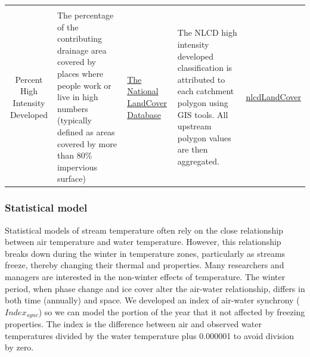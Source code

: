 \documentclass[]{article}
\begin{document}
\begin{longtable}[c]{@{}cllll@{}}
\begin{minipage}[t]{0.16\columnwidth}
\strut\end{minipage}\tabularnewline
\begin{minipage}[t]{0.10\columnwidth}\centering\strut
Percent High Intensity Developed
\strut\end{minipage} &
\begin{minipage}[t]{0.24\columnwidth}\raggedright\strut
The percentage of the contributing drainage area covered by places where
people work or live in high numbers (typically defined as areas covered
by more than 80\% impervious surface)
\strut\end{minipage} &
\begin{minipage}[t]{0.14\columnwidth}\raggedright\strut
\href{http://www.mrlc.gov/nlcd06_data.php}{The National LandCover
Database}
\strut\end{minipage} &
\begin{minipage}[t]{0.23\columnwidth}\raggedright\strut
The NLCD high intensity developed classification is attributed to each
catchment polygon using GIS tools. All upstream polygon values are then
aggregated.
\strut\end{minipage} &
\begin{minipage}[t]{0.16\columnwidth}\raggedright\strut
\href{https://github.com/Conte-Ecology/shedsData/tree/master/basinCharacteristics/rasterPrep/nlcdLandCover}{nlcdLandCover}
\strut\end{minipage}\tabularnewline
\bottomrule
\end{longtable}

\subsubsection{Statistical model}\label{statistical-model}

Statistical models of stream temperature often rely on the close
relationship between air temperature and water temperature. However,
this relationship breaks down during the winter in temperature zones,
particularly as streams freeze, thereby changing their thermal and
properties. Many researchers and managers are interested in the
non-winter effects of temperature. The winter period, when phase change
and ice cover alter the air-water relationship, differs in both time
(annually) and space. We developed an index of air-water synchrony
(\(Index_{sync}\)) so we can model the portion of the year that it not
affected by freezing properties. The index is the difference between air
and observed water temperatures divided by the water temperature plus
0.000001 to avoid division by zero.
\end{document}
